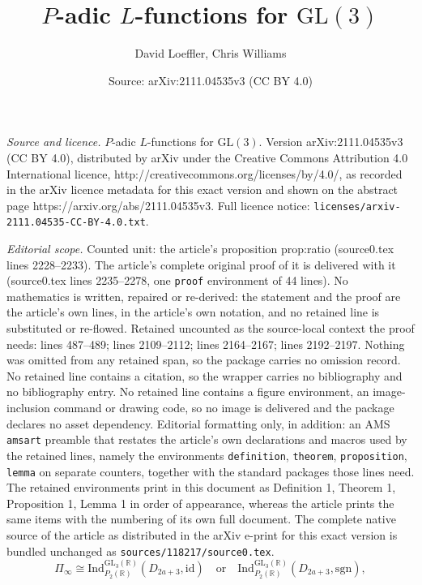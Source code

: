 \documentclass[10pt,a4paper]{amsart}
\title{$P$-adic $L$-functions for $\mathrm{GL}(3)$}
\author{David Loeffler, Chris Williams}
\date{Source: arXiv:2111.04535v3 (CC BY 4.0)}
\newcommand{\GL}{\mathrm{GL}}
\newcommand{\R}{\mathbb{R}}
\begin{document}
\maketitle

\noindent\emph{Source and licence.} $P$-adic $L$-functions for $\mathrm{GL}(3)$. Version arXiv:2111.04535v3 (CC BY 4.0), distributed by arXiv under the Creative Commons Attribution 4.0 International licence, http://creativecommons.org/licenses/by/4.0/, as recorded in the arXiv licence metadata for this exact version and shown on the abstract page https://arxiv.org/abs/2111.04535v3. Full licence notice: \texttt{licenses/arxiv-2111.04535-CC-BY-4.0.txt}.\par\smallskip

\noindent\textit{Editorial scope.} Counted unit: the article's proposition prop:ratio (source0.tex lines 2228--2233). The article's complete original proof of it is delivered with it (source0.tex lines 2235--2278, one \texttt{proof} environment of 44 lines). No mathematics is written, repaired or re-derived: the statement and the proof are the article's own lines, in the article's own notation, and no retained line is substituted or re-flowed.  Retained uncounted as the source-local context the proof needs: lines 487--489; lines 2109--2112; lines 2164--2167; lines 2192--2197.  Nothing was omitted from any retained span, so the package carries no omission record.  No retained line contains a citation, so the wrapper carries no bibliography and no bibliography entry.  No retained line contains a figure environment, an image-inclusion command or drawing code, so no image is delivered and the package declares no asset dependency.  Editorial formatting only, in addition: an AMS \texttt{amsart} preamble that restates the article's own declarations and macros used by the retained lines, namely the environments \texttt{definition}, \texttt{theorem}, \texttt{proposition}, \texttt{lemma} on separate counters, together with the standard packages those lines need.  The retained environments print in this document as Definition 1, Theorem 1, Proposition 1, Lemma 1 in order of appearance, whereas the article prints the same items with the numbering of its own full document.  The complete native source of the article as distributed in the arXiv e-print for this exact version is bundled unchanged as \texttt{sources/118217/source0.tex}.
\begin{equation}\label{eq:Pi_infty}
	\Pi_\infty \cong \mathrm{Ind}_{P_2(\R)}^{\GL_3(\R)} (D_{2a+3}, \mathrm{id}) \quad\text{or}\quad \mathrm{Ind}_{P_2(\R)}^{\GL_3(\R)} (D_{2a+3}, \mathrm{sgn}),
\end{equation}
\end{document}
